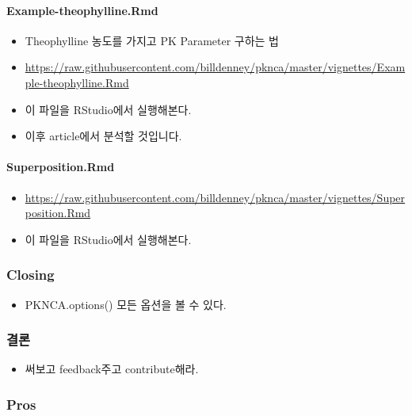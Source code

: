 \documentclass[]{krantz}
\providecommand{\tightlist}{%
  \setlength{\itemsep}{0pt}\setlength{\parskip}{0pt}}
\let\oldparagraph\paragraph
\renewcommand{\paragraph}[1]{\oldparagraph{#1}\mbox{}}
\theoremstyle{definition}
\theoremstyle{definition}
\theoremstyle{definition}
\theoremstyle{remark}
\begin{document}
\paragraph{Example-theophylline.Rmd}\label{example-theophylline.rmd}

\begin{itemize}
\tightlist
\item
  Theophylline 농도를 가지고 PK Parameter 구하는 법
\item
  \url{https://raw.githubusercontent.com/billdenney/pknca/master/vignettes/Example-theophylline.Rmd}
\item
  이 파일을 RStudio에서 실행해본다.
\item
  이후 article에서 분석할 것입니다.
\end{itemize}

\paragraph{Superposition.Rmd}\label{superposition.rmd}

\begin{itemize}
\tightlist
\item
  \url{https://raw.githubusercontent.com/billdenney/pknca/master/vignettes/Superposition.Rmd}
\item
  이 파일을 RStudio에서 실행해본다.
\end{itemize}

\subsubsection{Closing}\label{closing}

\begin{itemize}
\tightlist
\item
  PKNCA.options() 모든 옵션을 볼 수 있다.
\end{itemize}

\subsubsection{결론}

\begin{itemize}
\tightlist
\item
  써보고 feedback주고 contribute해라.
\end{itemize}

\subsubsection{Pros}\label{pros-1}
\end{document}
